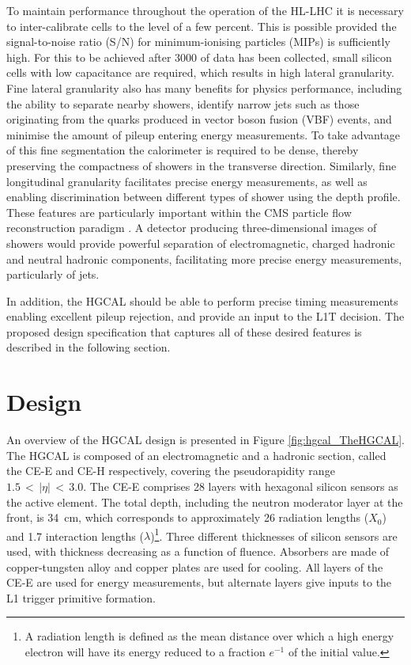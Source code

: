 To maintain performance throughout the operation of the HL-LHC it is necessary 
to inter-calibrate cells to the level of a few percent.
This is possible provided the signal-to-noise ratio (S/N) 
for minimum-ionising particles (MIPs) is sufficiently high.
For this to be achieved after \SI{3000}{\fbinv} of data has been collected, 
small silicon cells with low capacitance are required, which results in high lateral granularity.
Fine lateral granularity also has many benefits for physics performance, 
including the ability to separate nearby showers, identify narrow jets 
such as those originating from the quarks produced in vector boson fusion (VBF) events, 
and minimise the amount of pileup entering energy measurements.
To take advantage of this fine segmentation the calorimeter is required to be dense, 
thereby preserving the compactness of showers in the transverse direction.
Similarly, fine longitudinal granularity facilitates precise energy measurements, 
as well as enabling discrimination between different types of shower using the depth profile.
These features are particularly important 
within the CMS particle flow reconstruction paradigm \cite{ParticleFlow}.
A detector producing three-dimensional images of showers would provide 
powerful separation of electromagnetic, charged hadronic and neutral hadronic components,
facilitating more precise energy measurements, particularly of jets.

In addition, the HGCAL should be able to perform precise timing measurements 
enabling excellent pileup rejection, and provide an input to the L1T decision.
The proposed design specification that captures all of these desired features 
is described in the following section.

\section{Design}

An overview of the HGCAL design is presented in Figure \ref{fig:hgcal_TheHGCAL}.
The HGCAL is composed of an electromagnetic and a hadronic section, called the CE-E and CE-H respectively, covering the pseudorapidity range $1.5\,<\,|\eta|\,<\,3.0$.
The CE-E comprises 28 layers with hexagonal silicon sensors as the active element.
The total depth, including the neutron moderator layer at the front, is \SI{34}{cm}, 
which corresponds to approximately 26 radiation lengths ($X_0$) 
and 1.7 interaction lengths ($\lambda$)\footnote{A radiation length is defined 
as the mean distance over which 
a high energy electron will have its energy reduced to a fraction $e^{-1}$ of the initial value.}.
Three different thicknesses of silicon sensors are used, with thickness decreasing as a function of fluence.
Absorbers are made of copper-tungsten alloy and copper plates are used for cooling.
All layers of the CE-E are used for energy measurements, but alternate layers give inputs to the L1 trigger primitive formation. %

